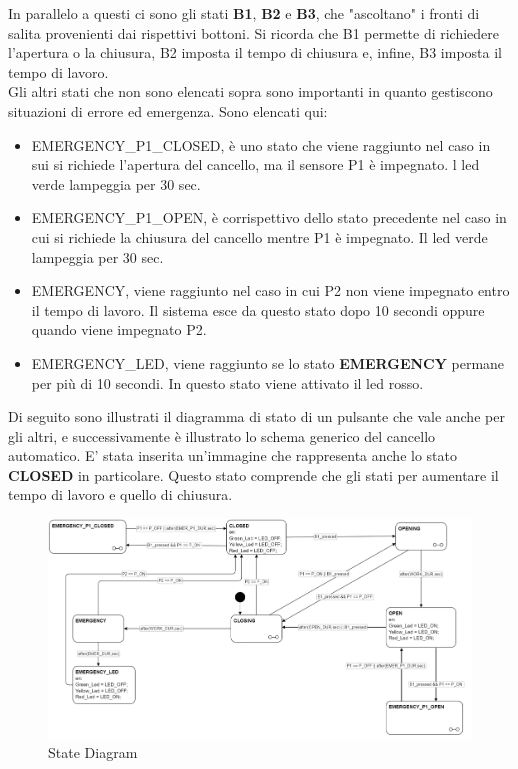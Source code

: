 \documentclass[12pt]{article}
\begin{document}
In parallelo a questi ci sono gli stati \textbf{B1}, \textbf{B2} e 
\textbf{B3}, che "ascoltano" i fronti di salita provenienti dai rispettivi bottoni.
Si ricorda che B1 permette di richiedere l'apertura o la chiusura, B2 imposta il tempo di chiusura e, infine, B3 imposta il tempo di lavoro.\\

Gli altri stati che non sono elencati sopra sono importanti in quanto gestiscono situazioni di errore ed emergenza. Sono elencati qui:

\begin{itemize}
    \item{EMERGENCY\_P1\_CLOSED,} è uno stato che viene raggiunto nel caso in sui si richiede l'apertura del cancello, ma il sensore P1 è impegnato. l led verde lampeggia per 30 sec.
    \item{EMERGENCY\_P1\_OPEN,} è corrispettivo dello stato precedente nel caso in cui si richiede la chiusura del cancello mentre P1 è impegnato. Il led verde lampeggia per 30 sec.
    \item{EMERGENCY,} viene raggiunto nel caso in cui P2 non viene impegnato entro il tempo di lavoro. Il sistema esce da questo stato dopo 10 secondi oppure quando viene impegnato P2.
    \item{EMERGENCY\_LED}, viene raggiunto se lo stato \textbf{EMERGENCY} permane per più di 10 secondi. In questo stato viene attivato il led rosso.
\end{itemize}

Di seguito sono illustrati il diagramma di stato di un pulsante che vale anche per gli altri, e successivamente è illustrato lo schema generico del cancello automatico. E' stata inserita un'immagine che rappresenta anche lo stato \textbf{CLOSED} in particolare. Questo stato comprende che gli stati per aumentare il tempo di lavoro e quello di chiusura.
\newpage
\begin{landscape}
\begin{figure}[h] %
    \centering %
    \includegraphics[width=1.5\textwidth]{state_diagram0.png} %
    \caption{State Diagram} %
    \label{fig:General State Diagram} %
\end{figure}
\end{landscape}
\end{document}

